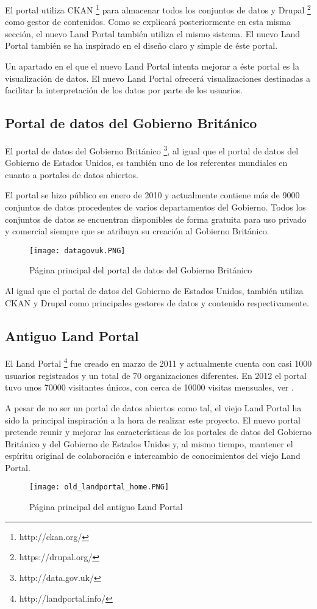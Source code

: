El portal utiliza CKAN \footnote{http://ckan.org/} para almacenar todos los conjuntos de datos y Drupal \footnote{https://drupal.org/} como gestor de contenidos.  Como se explicará posteriormente en esta misma sección, el nuevo Land Portal también utiliza el mismo sistema.  El nuevo Land Portal también se ha inspirado en el diseño claro y simple de éste portal.

Un apartado en el que el nuevo Land Portal intenta mejorar a éste portal es la visualización de datos. El nuevo Land Portal ofrecerá visualizaciones destinadas a facilitar la interpretación de los datos por parte de los usuarios.

\subsection{Portal de datos del Gobierno Británico}
El portal de datos del Gobierno Británico \footnote{http://data.gov.uk/}, al igual que el portal de datos del Gobierno de Estados Unidos, es también uno de los referentes mundiales en cuanto a portales de datos abiertos.

El portal se hizo público en enero de 2010 y actualmente contiene más de 9000 conjuntos de datos procedentes de varios departamentos del Gobierno.  Todos los conjuntos de datos se encuentran disponibles de forma gratuita para uso privado y comercial siempre que se atribuya su creación al Gobierno Británico.
\begin{figure}[h]
\centering
\texttt{[image: datagovuk.PNG]}
\caption{Página principal del portal de datos del Gobierno Británico}
\end{figure}
Al igual que el portal de datos del Gobierno de Estados Unidos, también utiliza CKAN y Drupal como principales gestores de datos y contenido respectivamente.

\subsection{Antiguo Land Portal}
El Land Portal \footnote{http://landportal.info/} fue creado en marzo de 2011 y actualmente cuenta con casi 1000 usuarios registrados y un total de 70 organizaciones diferentes. En 2012 el portal tuvo unos 70000 visitantes únicos, con cerca de 10000 visitas mensuales, ver \cite[página 3]{landportal-strategy}.

A pesar de no ser un portal de datos abiertos como tal, el viejo Land Portal ha sido la principal inspiración a la hora de realizar este proyecto. El nuevo portal pretende reunir y mejorar las características de los portales de datos del Gobierno Británico y del Gobierno de Estados Unidos y, al mismo tiempo, mantener el espíritu original de colaboración e intercambio de conocimientos del viejo Land Portal.
\begin{figure}[h]
\centering
\texttt{[image: old\_landportal\_home.PNG]}
\caption{Página principal del antiguo Land Portal}
\end{figure}

